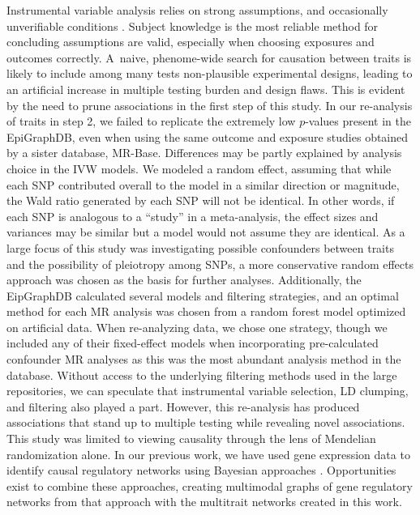 \documentclass[genes,article,accept,moreauthors,pdftex]{Definitions/mdpi}
\begin{document}
\begin{paracol}{2}
Instrumental variable analysis relies on strong assumptions, and occasionally unverifiable conditions \cite{labrecque_understanding_2018}. Subject knowledge is the most reliable method for concluding assumptions are valid, especially when choosing exposures and outcomes correctly. A~naive, phenome-wide search for causation between traits is likely to include among many tests non-plausible experimental designs, leading to an artificial increase in multiple testing burden and design flaws. This is evident by the need to prune associations in the first step of this study. In our re-analysis of traits in step 2, we failed to replicate the extremely low $p$-values present in the EpiGraphDB, even when using the same outcome and exposure studies obtained by a sister database, MR-Base. {Differences may be partly explained by analysis choice in the IVW models. We modeled a random effect, assuming that while each SNP contributed overall to the model in a similar direction or magnitude, the Wald ratio generated by each SNP will not be identical. In other words, if each SNP is analogous to a ``study'' in a meta-analysis, the effect sizes and variances may be similar but a model would not assume they are identical. As a large focus of this study was investigating possible confounders between traits and the possibility of pleiotropy among SNPs, a more conservative random effects approach was chosen as the basis for further analyses. Additionally, the EipGraphDB calculated several models and filtering strategies, and an optimal method for each MR analysis was chosen from a random forest model optimized on artificial data. When re-analyzing data, we chose one strategy, though we included any of their fixed-effect models when incorporating pre-calculated confounder MR analyses as this was the most abundant analysis method in the database.} Without access to the underlying filtering methods used in the large repositories, we can speculate that instrumental variable selection, LD clumping, and filtering {also} played a part. However, this re-analysis has produced associations that stand up to multiple testing while revealing novel associations. This study was limited to viewing causality through the lens of Mendelian randomization alone. In our previous work, we have used gene expression data to identify causal regulatory networks using Bayesian approaches \cite{Aziz_2020}. Opportunities exist to combine these approaches, creating multimodal graphs of gene regulatory networks from that approach with the multitrait networks created in this work. 


\end{paracol}
\end{document}
